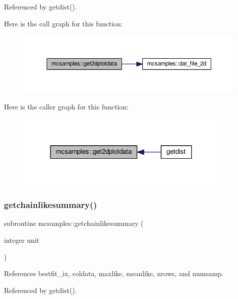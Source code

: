 Referenced by getdist().

Here is the call graph for this function\+:
\nopagebreak
\begin{figure}[H]
\begin{center}
\leavevmode
\includegraphics[width=350pt]{namespacemcsamples_a67c86279d2ba781324578c13807fa812_cgraph}
\end{center}
\end{figure}
Here is the caller graph for this function\+:
\nopagebreak
\begin{figure}[H]
\begin{center}
\leavevmode
\includegraphics[width=294pt]{namespacemcsamples_a67c86279d2ba781324578c13807fa812_icgraph}
\end{center}
\end{figure}
\mbox{\label{namespacemcsamples_a97959f867d590fadb6638910b52409bd}} 
\subsubsection{\texorpdfstring{getchainlikesummary()}{getchainlikesummary()}}
{\footnotesize\ttfamily subroutine mcsamples\+::getchainlikesummary (\begin{DoxyParamCaption}\item[{integer}]{unit }\end{DoxyParamCaption})}



References bestfit\+\_\+ix, coldata, maxlike, meanlike, nrows, and numsamp.



Referenced by getdist().

